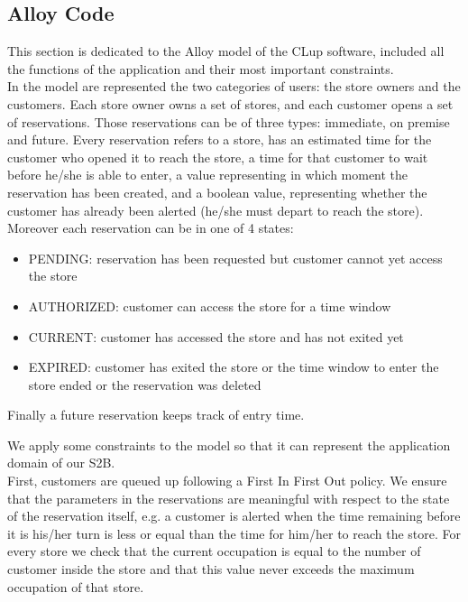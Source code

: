 \subsection{Alloy Code}
This section is dedicated to the Alloy model of the CLup  software, included all the functions of the application and their most important constraints.\\
In the model are represented the two categories of users: the store owners and the customers. Each store owner owns a set of stores, and each customer opens a set of reservations. Those reservations can be of three types: immediate, on premise and future. Every reservation refers to a store, has an estimated time for the customer who opened it to reach the store, a time for that customer to wait before he/she is able to enter, a value representing in which moment the reservation has been created, and a boolean value, representing whether the customer has already been alerted (he/she must depart to reach the store). Moreover each reservation can be in one of 4 states:
\begin{itemize}
	\item PENDING: reservation has been requested but customer cannot yet access the store
	\item AUTHORIZED: customer can access the store for a time window
	\item CURRENT: customer has accessed the store and has not exited yet
	\item EXPIRED: customer has exited the store or the time window to enter the store ended or the reservation was deleted
\end{itemize}
Finally a future reservation keeps track of entry time.

We apply some constraints to the model so that it can represent the application domain of our S2B.\\
First, customers are queued up following a First In First Out policy. We ensure that the parameters in the reservations are meaningful with respect to the state of the reservation itself, e.g. a customer is alerted when the time remaining before it is his/her turn is less or equal than the time for him/her to reach the store. For every store we check that the current occupation is equal to the number of customer inside the store and that this value never exceeds the maximum occupation of that store.


\newpage
